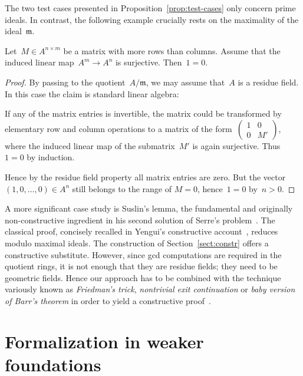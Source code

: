 \documentclass[envcountsect,envcountsame,runningheads]{llncs}
\newcommand{\mmm}{\mathfrak{m}}
\renewcommand{\_}{\mathpunct{.}\,}
\begin{document}
The two test cases presented in Proposition~\ref{prop:test-cases} only concern
prime ideals. In contrast, the following example crucially rests on the
maximality of the ideal~$\mmm$.

\begin{proposition}\label{prop:surj-matrix}Let~$M \in A^{n \times m}$ be a matrix with more rows than
columns. Assume that the induced linear map~$A^m \to A^n$ is surjective.
Then~$1 = 0$.
\end{proposition}

\begin{proof}By passing to the quotient~$A/\mmm$, we may assume that~$A$ is a
residue field. In this case the claim is standard linear algebra:

If any of the matrix entries
is invertible, the matrix could be transformed by elementary row and
column operations to a matrix of the form~$\left(\begin{smallmatrix}1 & 0 \\ 0 &
M'\end{smallmatrix}\right)$, where the induced linear map of the submatrix~$M'$ is again
surjective. Thus~$1 = 0$ by induction.

Hence by the residue field property all matrix entries are zero.
But the vector $(1,0,\ldots,0)\in A^n$ still
belongs to the range of $M=0$, hence~$1=0$ by~$n > 0$.
\end{proof}

\begin{remark}\label{rem:suslin}
A more significant case study is Suslin's lemma, the fundamental and originally
non-constructive ingredient in his second solution of Serre's
problem~\cite{suslin:structure}. The classical proof, concisely recalled in
Yengui's constructive account~\cite{yengui:maximal}, reduces modulo
maximal ideals. The construction of Section~\ref{sect:constr} offers a
constructive substitute. However, since gcd computations
are required in the quotient rings, it is not enough that they are residue
fields; they need to be geometric fields. Hence our approach has to be combined
with the technique variously known as \emph{Friedman's trick}, \emph{nontrivial
exit continuation} or \emph{baby version of Barr's theorem} in order to yield a
constructive
proof~\cite{friedman:trick,murthy:classical-proofs,barr:without-points,blechschmidt:generalized-spaces}.
\end{remark}


\section{Formalization in weaker foundations}
\label{sect:arithmetization}
\end{document}
